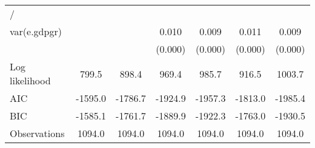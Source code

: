 \begin{table}[htbp]
\begin{tabular}{l*{6}{c}}
\hline
/                   &                     &                     &                     &                     &                     &                     \\
var(e.gdpgr)        &                     &                     &       0.010\sym{***}&       0.009\sym{***}&       0.011\sym{***}&       0.009\sym{***}\\
                    &                     &                     &     (0.000)         &     (0.000)         &     (0.000)         &     (0.000)         \\
\hline
Log likelihood      &       799.5         &       898.4         &       969.4         &       985.7         &       916.5         &      1003.7         \\
AIC                 &     -1595.0         &     -1786.7         &     -1924.9         &     -1957.3         &     -1813.0         &     -1985.4         \\
BIC                 &     -1585.1         &     -1761.7         &     -1889.9         &     -1922.3         &     -1763.0         &     -1930.5         \\
Observations        &      1094.0         &      1094.0         &      1094.0         &      1094.0         &      1094.0         &      1094.0         \\
\hline\hline
\end{tabular}
\end{table}
